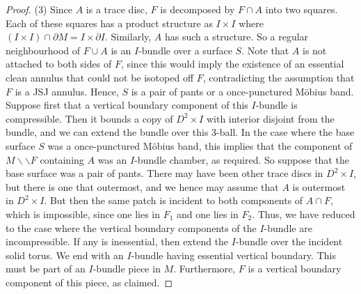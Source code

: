 \documentclass[oneside]{amsart}
\numberwithin{equation}{section}
\theoremstyle{plain}
\theoremstyle{definition}
\newcommand{\cut}{\backslash\backslash}
\begin{document}
\begin{proof}
(3) Since $A$ is a trace disc, $F$ is decomposed by $F \cap A$ into two squares. Each of these squares has a product structure as $I \times I$ where $(I \times I) \cap \partial M = I \times \partial I$. Similarly, $A$ has such a structure. So a regular neighbourhood of $F \cup A$ is an $I$-bundle over a surface $S$. Note that $A$ is not attached to both sides of $F$, since this would imply the existence of an essential clean annulus that could not be isotoped off $F$, contradicting the assumption that $F$ is a JSJ annulus. Hence, $S$ is a pair of pants or a once-punctured M\"obius band. Suppose first that a vertical boundary component of this $I$-bundle is compressible. Then it bounds a copy of $D^2 \times I$ with interior disjoint from the bundle, and we can extend the bundle over this 3-ball. In the case where the base surface $S$ was a once-punctured M\"obius band, this implies that the component of $M \cut F$ containing $A$ was an $I$-bundle chamber, as required. So suppose that the base surface was a pair of pants. There may have been other trace discs in $D^2 \times I$, but there is one that outermost, and we hence may assume that $A$ is outermost in $D^2 \times I$. But then the same patch is incident to both components of $A \cap F$, which is impossible, since one lies in $F_1$ and one lies in $F_2$. Thus, we have reduced to the case where the vertical boundary components of the $I$-bundle are incompressible. If any is inessential, then extend the $I$-bundle over the incident solid torus. We end with an $I$-bundle having essential vertical boundary. This must be part of an $I$-bundle piece in $M$. Furthermore, $F$ is a vertical boundary component of this piece, as claimed.
\end{proof}
\end{document}
